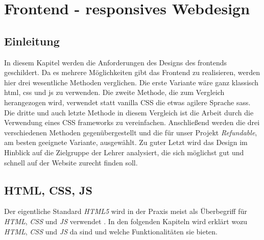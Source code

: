 
\section{Frontend - responsives Webdesign}
\label{chapter:study-frontend}
	\subsection{Einleitung}
	\label{chapter:study-frontend-einleitung}
	In diesem Kapitel werden die Anforderungen des Designs des \Gls{frontend}s geschildert. Da es mehrere Möglichkeiten gibt das Frontend zu realisieren, werden hier drei wesentliche Methoden verglichen. Die erste Variante wäre ganz klassisch \Gls{html}, \Gls{css} und \Gls{js} zu verwenden. Die zweite Methode, die zum Vergleich herangezogen wird, verwendet statt \Gls{vanilla} CSS die etwas agilere Sprache \Gls{sass}. Die dritte und auch letzte Methode in diesem Vergleich ist die Arbeit durch die Verwendung eines CSS \Gls{framework}s zu vereinfachen. Anschließend werden die drei verschiedenen Methoden gegenübergestellt und die für unser Projekt \textit{Refundable}, am besten geeignete Variante, ausgewählt. Zu guter Letzt wird das Design im Hinblick auf die Zielgruppe der Lehrer analysiert, die sich möglichst gut und schnell auf der Website zurecht finden soll.
	
	\subsection{HTML, CSS, JS}
	\label{chapter:study-frontend-html-css-js}
	Der eigentliche Standard \textit{HTML5} wird in der Praxis meist als Überbegriff für \textit{HTML}, \textit{CSS} und \textit{JS} verwendet \cite{html5-css3-handbuch}. In den folgenden Kapiteln wird erklärt wozu \textit{HTML}, \textit{CSS} und \textit{JS} da sind und welche Funktionalitäten sie bieten.
	
